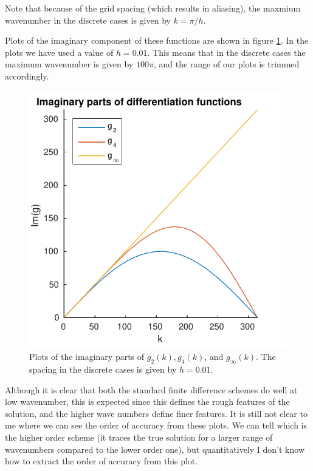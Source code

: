 \documentclass{article}
\begin{document}
Note that because of the grid spacing (which results in aliasing), the maxmium wavenumber in the discrete cases is given by $k = \pi / h$.

Plots of the imaginary component of these functions are shown in figure \ref{fig:p1}.
In the plots we have used a value of $h = 0.01$.
This means that in the discrete cases the maximum wavenumber is given by $100\pi$, and the range of our plots is trimmed accordingly.

\begin{figure}[!ht]
\centering
\includegraphics[scale=1.0]{p1.pdf}
\caption{Plots of the imaginary parts of $g_2(k), g_4(k)$, and $g_\infty(k)$. The spacing in the discrete cases is given by $h = 0.01$.}
\label{fig:p1}
\end{figure}

Although it is clear that both the standard finite difference schemes do well at low wavenumber, this is expected since this defines the rough features of the solution, and the higher wave numbers define finer features.
It is still not clear to me where we can see the order of accuracy from these plots.
We can tell which is the higher order scheme (it traces the true solution for a larger range of wavenumbers compared to the lower order one), but quantitatively I don't know how to extract the order of accuracy from this plot.
\end{document}
